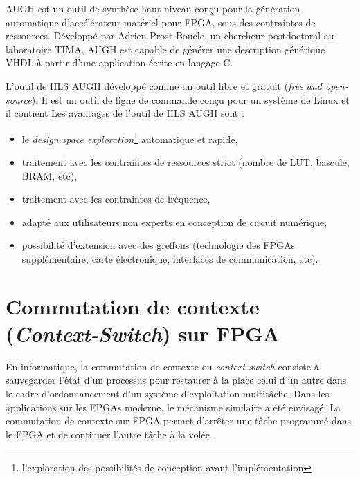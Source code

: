 AUGH est un outil de synthèse haut niveau conçu pour la génération automatique d'accélérateur matériel
pour FPGA, sous des contraintes de ressources\cite{Prost2014}. Développé par 
Adrien Prost-Boucle, un chercheur postdoctoral au laboratoire TIMA, 
AUGH est capable de générer une description générique VHDL à partir
d'une application écrite en langage C. 

L'outil de HLS AUGH développé comme un outil libre et gratuit (\emph{free and open-source}).
Il est un outil de ligne de commande conçu pour un système de Linux et il contient 
Les avantages de l'outil de HLS AUGH sont :
\begin{itemize}
	\item
	
	le \emph{design space exploration}\footnote{l'exploration des possibilités de conception avant l'implémentation} automatique et rapide,
	
	\item
	
	traitement avec les contraintes de ressources strict (nombre de LUT, bascule, BRAM, etc),
	
	\item 
	
	traitement avec les contraintes de fréquence,
	
	\item 
	
	adapté aux utilisateurs non experts en conception de circuit numérique,
	
	\item
	
	possibilité d'extension avec des greffons (technologie des FPGAs supplémentaire, carte électronique, interfaces de communication, etc).

\end{itemize}

\section{Commutation de contexte (\emph{Context-Switch}) sur FPGA}
\label{sec:contextswitch}
En informatique, la commutation de contexte ou \emph{context-switch} consiste à sauvegarder l'état d'un processus pour restaurer à la place celui d'un autre
dans le cadre d'ordonnancement d'un système d'exploitation multitâche.
Dans les applications sur les FPGAs moderne, le mécanisme similaire a été envisagé. La commutation de contexte sur FPGA
permet d'arrêter une tâche programmé dans le FPGA et de continuer l'autre tâche à la volée.

